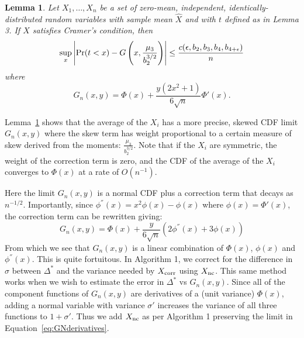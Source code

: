 \documentclass{article}
\newtheorem{lemma}{Lemma}
\begin{document}
\begin{lemma}\label{lem:clt_edgeworth}
Let $X_1,\ldots,X_n$ be a set of zero-mean, independent, identically-distributed
random variables with sample mean $\hat{X}$ and with $t$ defined as in Lemma 3.
If $X$ satisfies Cramer's condition, then
\begin{equation}\label{eq:clt-bounds_edgeworth}
    \sup_x\left|{\rm Pr}(t<x) - G\left(x, \frac{\mu_3}{b_2^{3/2}}\right)\right| \leq \frac{c(\epsilon,b_2,b_3,b_4,b_{4+\epsilon})}{n}
\end{equation}
where
\begin{equation}
    G_n(x,y) = \Phi(x) + \frac{y(2x^2+1)}{6\sqrt{n}}\Phi'(x).
\end{equation}
\end{lemma}

Lemma~\ref{lem:clt_edgeworth} shows that the average of the $X_i$ has a more
precise, skewed CDF limit $G_n(x,y)$ where the skew term has weight proportional
to a certain measure of skew derived from the moments:
$\frac{\mu_3}{b_2^{3/2}}$. Note that if the $X_i$ are symmetric, the weight of
the correction term is zero, and the CDF of the average of the $X_i$ converges
to $\Phi(x)$ at a rate of $O(n^{-1})$.

Here the limit $G_n(x,y)$ is a normal CDF plus a correction term that decays as
$n^{-1/2}$.
Importantly, since $\phi^{''}(x) = x^2\phi(x) - \phi(x)$ where
$\phi(x)=\Phi'(x)$, the correction term can be rewritten giving:
\begin{equation}\label{eq:GNderivatives}
    G_n(x,y) = \Phi(x) + \frac{y}{6\sqrt{n}}(2\phi^{''}(x)+3\phi(x))
\end{equation}
From which we see that $G_n(x,y)$ is a linear combination of $\Phi(x)$,
$\phi(x)$ and $\phi^{''}(x)$. This is quite fortuitous. In Algorithm 1, we
correct for the difference in $\sigma$ between $\Delta^*$ and the variance
needed by $X_{\rm corr}$ using $X_{\rm nc}$. This same method works when we
wish to estimate the error in $\Delta^*$ vs $G_n(x,y)$. Since all of the
component functions of $G_n(x,y)$ are derivatives of a (unit variance)
$\Phi(x)$, adding a normal variable with variance $\sigma'$ increases the
variance of all three functions to $1+\sigma'$. Thus we add $X_{\rm nc}$ as
per Algorithm 1 preserving the limit in Equation~\ref{eq:GNderivatives}.
\end{document}
